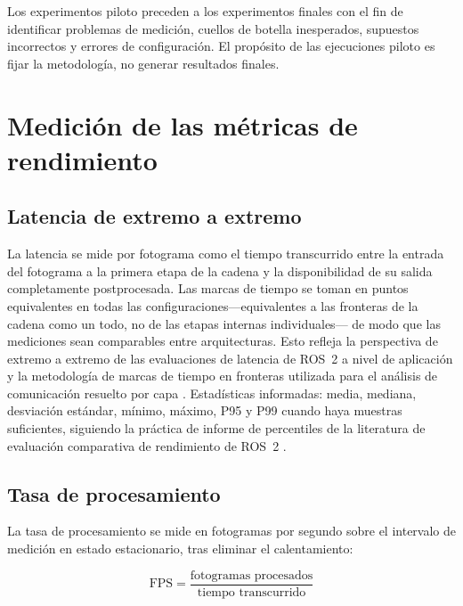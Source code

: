 Los experimentos piloto preceden a los experimentos finales con el fin de
identificar problemas de medición, cuellos de botella inesperados,
supuestos incorrectos y errores de configuración. El propósito de las
ejecuciones piloto es fijar la metodología, no generar resultados finales.

\section{Medición de las métricas de rendimiento}
\label{sec:metric-measurement}

\subsection{Latencia de extremo a extremo}

La latencia se mide por fotograma como el tiempo transcurrido entre la
entrada del fotograma a la primera etapa de la cadena y la disponibilidad de
su salida completamente postprocesada. Las marcas de tiempo se toman en
puntos equivalentes en todas las configuraciones---equivalentes a las
fronteras de la cadena como un todo, no de las etapas internas
individuales--- de modo que las mediciones sean comparables entre
arquitecturas. Esto refleja la perspectiva de extremo a extremo de las
evaluaciones de latencia de ROS~2 a nivel de aplicación \cite{betz2023a} y
la metodología de marcas de tiempo en fronteras utilizada para el análisis
de comunicación resuelto por capa \cite{kamiya2025}.
 Estadísticas informadas: media, mediana,
desviación estándar, mínimo, máximo, P95 y P99 cuando haya muestras
suficientes, siguiendo la práctica de informe de percentiles de la literatura
de evaluación comparativa de rendimiento de ROS~2 \cite{kronauer2021,
macenski2022}.

\subsection{Tasa de procesamiento}

La tasa de procesamiento se mide en fotogramas por segundo sobre el
intervalo de medición en estado estacionario, tras eliminar el calentamiento:

\begin{equation}
  \mathrm{FPS} = \frac{\text{fotogramas procesados}}{\text{tiempo
  transcurrido}}
  \label{eq:fps}
\end{equation}

